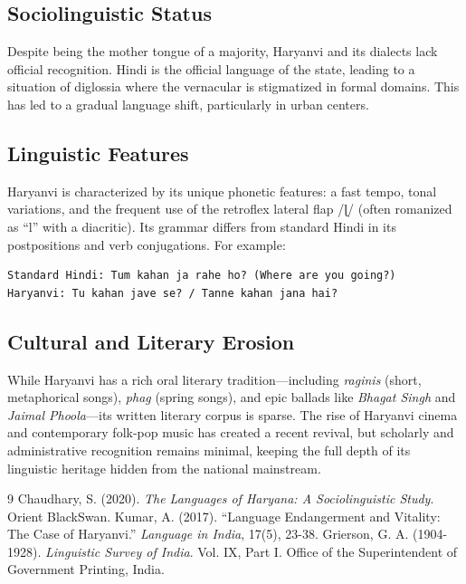 \documentclass[12pt]{article}
\begin{document}
\subsection{Sociolinguistic Status}
Despite being the mother tongue of a majority, Haryanvi and its dialects lack official recognition. Hindi is the official language of the state, leading to a situation of diglossia where the vernacular is stigmatized in formal domains. This has led to a gradual language shift, particularly in urban centers.

\subsection{Linguistic Features}
Haryanvi is characterized by its unique phonetic features: a fast tempo, tonal variations, and the frequent use of the retroflex lateral flap /ɭ/ (often romanized as ``l'' with a diacritic). Its grammar differs from standard Hindi in its postpositions and verb conjugations. For example:
\begin{verbatim}
Standard Hindi: Tum kahan ja rahe ho? (Where are you going?)
Haryanvi: Tu kahan jave se? / Tanne kahan jana hai?
\end{verbatim}

\subsection{Cultural and Literary Erosion}
While Haryanvi has a rich oral literary tradition—including \textit{raginis} (short, metaphorical songs), \textit{phag} (spring songs), and epic ballads like \textit{Bhagat Singh} and \textit{Jaimal Phoola}—its written literary corpus is sparse. The rise of Haryanvi cinema and contemporary folk-pop music has created a recent revival, but scholarly and administrative recognition remains minimal, keeping the full depth of its linguistic heritage hidden from the national mainstream.

\begin{thebibliography}{9}
 Chaudhary, S. (2020). \textit{The Languages of Haryana: A Sociolinguistic Study}. Orient BlackSwan.
 Kumar, A. (2017). ``Language Endangerment and Vitality: The Case of Haryanvi.'' \textit{Language in India}, 17(5), 23-38.
 Grierson, G. A. (1904-1928). \textit{Linguistic Survey of India}. Vol. IX, Part I. Office of the Superintendent of Government Printing, India.
\end{thebibliography}
\end{document}
